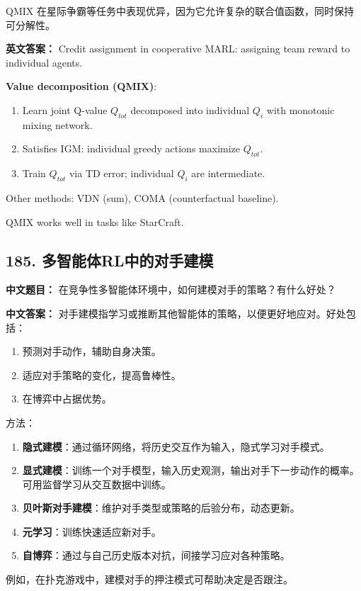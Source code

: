 \documentclass[10pt,a4paper]{ctexart}
\begin{document}
QMIX 在星际争霸等任务中表现优异，因为它允许复杂的联合值函数，同时保持可分解性。

\textbf{英文答案：}  
Credit assignment in cooperative MARL: assigning team reward to individual agents.

\textbf{Value decomposition (QMIX)}:
\begin{enumerate}
    \item Learn joint Q-value $Q_{tot}$ decomposed into individual $Q_i$ with monotonic mixing network.
    \item Satisfies IGM: individual greedy actions maximize $Q_{tot}$.
    \item Train $Q_{tot}$ via TD error; individual $Q_i$ are intermediate.
\end{enumerate}

Other methods: VDN (sum), COMA (counterfactual baseline).

QMIX works well in tasks like StarCraft.

\subsection*{185. 多智能体RL中的对手建模}
\textbf{中文题目：} 在竞争性多智能体环境中，如何建模对手的策略？有什么好处？

\textbf{中文答案：}  
对手建模指学习或推断其他智能体的策略，以便更好地应对。好处包括：
\begin{enumerate}
    \item 预测对手动作，辅助自身决策。
    \item 适应对手策略的变化，提高鲁棒性。
    \item 在博弈中占据优势。
\end{enumerate}

方法：
\begin{enumerate}
    \item \textbf{隐式建模}：通过循环网络，将历史交互作为输入，隐式学习对手模式。
    \item \textbf{显式建模}：训练一个对手模型，输入历史观测，输出对手下一步动作的概率。可用监督学习从交互数据中训练。
    \item \textbf{贝叶斯对手建模}：维护对手类型或策略的后验分布，动态更新。
    \item \textbf{元学习}：训练快速适应新对手。
    \item \textbf{自博弈}：通过与自己历史版本对抗，间接学习应对各种策略。
\end{enumerate}

例如，在扑克游戏中，建模对手的押注模式可帮助决定是否跟注。
\end{document}
